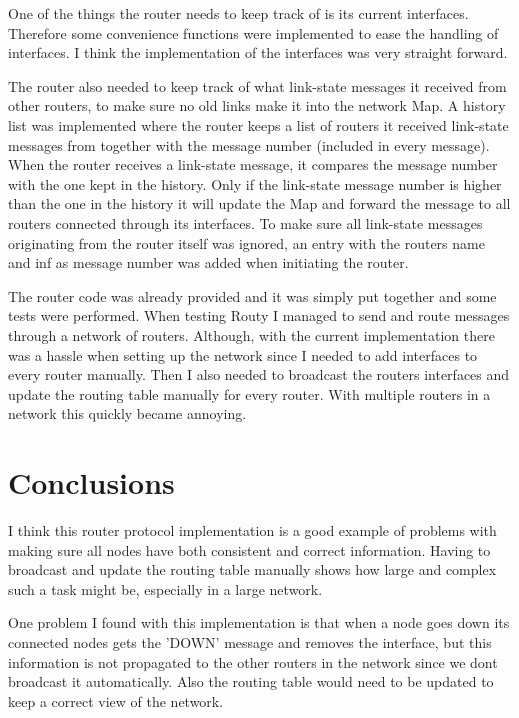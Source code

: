 \documentclass[a4paper, 11pt]{article}
\begin{document}
One of the things the router needs to keep track of is its current interfaces. Therefore some convenience functions were implemented to ease the handling of interfaces. I think the implementation of the interfaces was very straight forward.

The router also needed to keep track of what link-state messages it received from other routers, to make sure no old links make it into the network Map. A history list was implemented where the router keeps a list of routers it received link-state messages from together with the message number (included in every message). When the router receives a link-state message, it compares the message number with the one kept in the history. Only if the link-state message number is higher than the one in the history it will update the Map and forward the message to all routers connected through its interfaces. To make sure all link-state messages originating from the router itself was ignored, an entry with the routers name and inf as message number was added when initiating the router.

The router code was already provided and it was simply put together and some tests were performed. When testing Routy I managed to send and route messages through a network of routers. Although, with the current implementation there was a hassle when setting up the network since I needed to add interfaces to every router manually. Then I also needed to broadcast the routers interfaces and update the routing table manually for every router. With multiple routers in a network this quickly became annoying.

\section{Conclusions}

I think this router protocol implementation is a good example of problems with making sure all nodes have both consistent and correct information. Having to broadcast and update the routing table manually shows how large and complex such a task might be, especially in a large network.

One problem I found with this implementation is that when a node goes down its connected nodes gets the 'DOWN' message and removes the interface, but this information is not propagated to the other routers in the network since we dont broadcast it automatically. Also the routing table would need to be updated to keep a correct view of the network.
\end{document}
